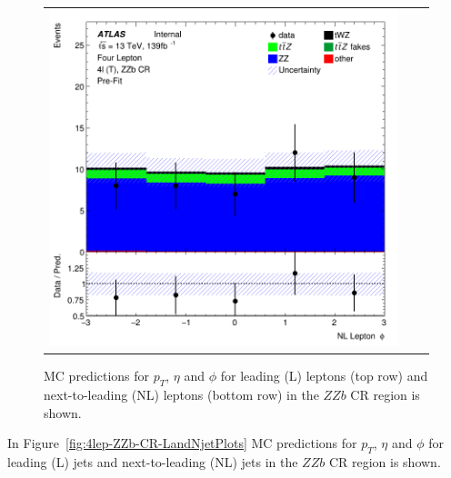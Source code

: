 \begin{figure}[htbp]
\begin{tabular}{ccc}
    \includegraphics[width=.3\textwidth]{figures/PreFitPlots/lep4_ZZb_4T_NL_lepton_phi.png} \\

  \end{tabular}
    \caption{MC predictions for $p_{T}$, $\eta$ and $\phi$ for leading (L) leptons (top row) and next-to-leading (NL) leptons (bottom row) in the $ZZb$ CR region  is shown.}
  \label{fig:4lep-ZZb-CR-leptonPlots}
\end{figure}

In Figure~\ref{fig:4lep-ZZb-CR-LandNjetPlots} MC predictions for $p_{T}$, $\eta$ and $\phi$ for leading (L) jets and next-to-leading (NL) jets in the $ZZb$ CR region is shown.


